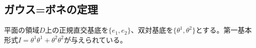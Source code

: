 
    \subsection{ガウス=ボネの定理}
        平面の領域$D$上の正規直交基底を$\{e_1, e_2\}$、双対基底を$\{\theta^1, \theta^2\}$とする。第一基本形式$I = \theta^1\theta^1 + \theta^2\theta^2$が与えられている。

